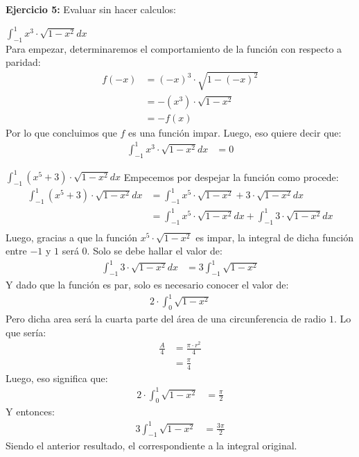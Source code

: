 \documentclass[../../main.tex]{subfiles}
\begin{document}
\question \textbf{Ejercicio 5:} Evaluar sin hacer calculos:
\begin{partes}
\parte $\int_{-1}^1 x^3 \cdot \sqrt{1-x^2}dx$\\

Para empezar, determinaremos el comportamiento de la función con respecto a paridad:
\begin{align*}
    f(-x) &= (-x)^3 \cdot \sqrt{1-(-x)^2}\\
    &= -(x^3) \cdot \sqrt{1-x^2}\\
    &= -f(x)
\end{align*}
Por lo que concluimos que $f$ es una función impar. Luego, eso quiere decir que:
\begin{align*}
    \int_{-1}^1 x^3 \cdot \sqrt{1-x^2}dx &= 0
\end{align*}

\parte $\int_{-1}^1 (x^5+3) \cdot \sqrt{1-x^2}dx$
Empecemos por despejar la función como procede:
\begin{align*}
    \int_{-1}^1 (x^5+3) \cdot \sqrt{1-x^2}dx &= \int_{-1}^1 x^5 \cdot \sqrt{1-x^2} + 3\cdot\sqrt{1-x^2}dx\\
    &= \int_{-1}^1 x^5 \cdot \sqrt{1-x^2} dx +\int_{-1}^1 3\cdot\sqrt{1-x^2}dx\\
\end{align*}
Luego, gracias a que la función $x^5 \cdot \sqrt{1-x^2}$ es impar, la integral de dicha función entre $-1$ y $1$ será 0. Solo se debe hallar el valor de:
\begin{align*}
    \int_{-1}^1 3\cdot\sqrt{1-x^2}dx &= 3\int_{-1}^1 \sqrt{1-x^2}
\end{align*}
Y dado que la función es par, solo es necesario conocer el valor de:
\begin{align*}
    2 \cdot \int_{0}^1 \sqrt{1-x^2}
\end{align*}
Pero dicha area será la cuarta parte del área de una circunferencia de radio $1$. Lo que sería:
\begin{align*}
    \frac{A}{4} &= \frac{\pi \cdot r^2}{4}\\
    &= \frac{\pi}{4}
\end{align*}
Luego, eso significa que:
\begin{align*}
    2 \cdot \int_{0}^1 \sqrt{1-x^2} &= \frac{\pi}{2}
\end{align*}
Y entonces:
\begin{align*}
    3\int_{-1}^1 \sqrt{1-x^2} &= \frac{3\pi}{2}
\end{align*}
Siendo el anterior resultado, el correspondiente a la integral original.

\end{partes}
\end{document}
